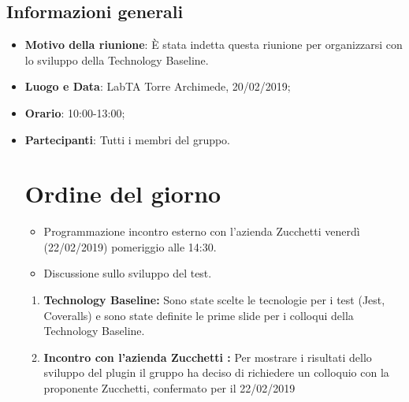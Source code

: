 \documentclass[12pt]{article}
\begin{document}
    \subsection{Informazioni generali}
    \begin{itemize}
        \item \textbf{Motivo della riunione}: È stata indetta questa riunione per organizzarsi con lo sviluppo della Technology Baseline.
        \item \textbf{Luogo e Data}: LabTA Torre Archimede, 20/02/2019;
        \item \textbf{Orario}: 10:00-13:00;
        \item \textbf{Partecipanti}: Tutti i membri del gruppo.
        \newpage
        \section{Ordine del giorno}
        \begin{itemize}
        \item Programmazione incontro esterno con l'azienda Zucchetti venerdì (22/02/2019) pomeriggio alle 14:30.
        \item Discussione sullo sviluppo del test.
        \end{itemize}
        
        \newpage
    \begin{enumerate}
\section{Risultati}
    \subsection{Ordine del giorno}
        \item \textbf{Technology Baseline:} Sono state scelte le tecnologie per i test (Jest, Coveralls) e sono state definite le prime slide per i colloqui della Technology Baseline.
        \item \textbf{Incontro con l'azienda Zucchetti :} Per mostrare i risultati dello sviluppo del plugin il gruppo ha deciso di richiedere un colloquio con la proponente Zucchetti, confermato per il 22/02/2019
    \end{enumerate}

\end{itemize}
\end{document}
